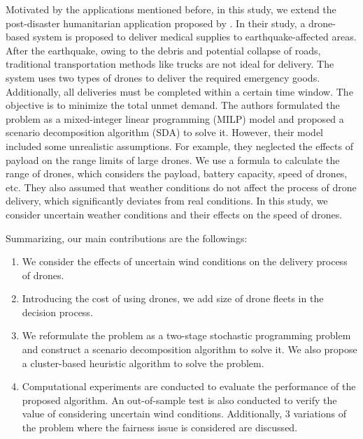 \documentclass[preprint,review,11pt,authoryear]{elsarticle}
\begin{document}
Motivated by the applications mentioned before, in this study, we extend the post-disaster humanitarian application proposed by \cite{dukkanci2023drones}. In their study, a drone-based system is proposed to deliver medical supplies to earthquake-affected areas. After the earthquake, owing to the debris and potential collapse of roads, traditional transportation methods like trucks are not ideal for delivery. The system uses two types of drones to deliver the required emergency goods. Additionally, all deliveries must be completed within a certain time window. The objective is to minimize the total unmet demand. The authors formulated the problem as a mixed-integer linear programming (MILP) model and proposed a scenario decomposition algorithm (SDA) to solve it. However, their model included some unrealistic assumptions. For example, they neglected the effects of payload on the range limits of large drones. We use a formula to calculate the range of drones, which considers the payload, battery capacity, speed of drones, etc. They also assumed that weather conditions do not affect the process of drone delivery, which significantly deviates from real conditions. In this study, we consider uncertain weather conditions and their effects on the speed of drones.

Summarizing, our main contributions are the followings:
\vspace{-7pt}
\begin{enumerate}[label=$\bullet$, itemsep=0em]
    \item We consider the effects of uncertain wind conditions on the delivery process of drones.
    \item Introducing the cost of using drones, we add size of drone fleets in the decision process.
    \item We reformulate the problem as a two-stage stochastic programming problem and construct a scenario decomposition algorithm to solve it. We also propose a cluster-based heuristic algorithm to solve the problem. %
    \item Computational experiments are conducted to evaluate the performance of the proposed algorithm. An out-of-sample test is also conducted to verify the value of considering uncertain wind conditions. Additionally, 3 variations of the problem where the fairness issue is considered are discussed.
\end{enumerate}
\vspace{-7pt}
\end{document}
